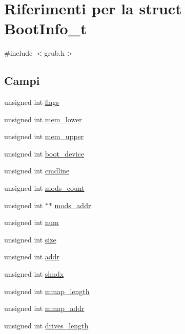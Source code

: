 \hypertarget{structBootInfo__t}{\section{Riferimenti per la struct Boot\+Info\+\_\+t}
\label{structBootInfo__t}
}


{\ttfamily \#include $<$grub.\+h$>$}

\subsection*{Campi}
\begin{DoxyCompactItemize}
\item 
unsigned int \hyperlink{structBootInfo__t_a255b75459b2ed645abe749075f3ca25d}{flags}
\item 
unsigned int \hyperlink{structBootInfo__t_a4b144c9db5fe2c5a9d72522068d65138}{mem\+\_\+lower}
\item 
unsigned int \hyperlink{structBootInfo__t_ab20281f521d626a49714e06b62291be9}{mem\+\_\+upper}
\item 
unsigned int \hyperlink{structBootInfo__t_a11fa989df3074f1a90fcb646aa434b97}{boot\+\_\+device}
\item 
unsigned int \hyperlink{structBootInfo__t_a23d97e399056fd818fdd31ceb1a07f42}{cmdline}
\item 
unsigned int \hyperlink{structBootInfo__t_a178ef95a8fbd89ec018899b9ba241d92}{mods\+\_\+count}
\item 
unsigned int $\ast$$\ast$ \hyperlink{structBootInfo__t_a1be510e25cd3a21bfd0d4d3b303e0543}{mods\+\_\+addr}
\item 
unsigned int \hyperlink{structBootInfo__t_a6a38dc50fe6f5719f544488a265b8cf1}{num}
\item 
unsigned int \hyperlink{structBootInfo__t_a761344d9a2bf10e1551dca7bd77f90cf}{size}
\item 
unsigned int \hyperlink{structBootInfo__t_ac0a248c150ec1bceaafc488988174a1d}{addr}
\item 
unsigned int \hyperlink{structBootInfo__t_ab2c8b3b8778032a87c0c2fe73245e9e8}{shndx}
\item 
unsigned int \hyperlink{structBootInfo__t_ac44eb8289f5f6fbbca78dc24e5052be7}{mmap\+\_\+length}
\item 
unsigned int \hyperlink{structBootInfo__t_a904e8344d4c4ef9a650305409b933b17}{mmap\+\_\+addr}
\item 
unsigned int \hyperlink{structBootInfo__t_adc0745eb234059fc6eb37d8a6c18e4b4}{drives\+\_\+length}
$$
\end{DoxyCompactItemize}
